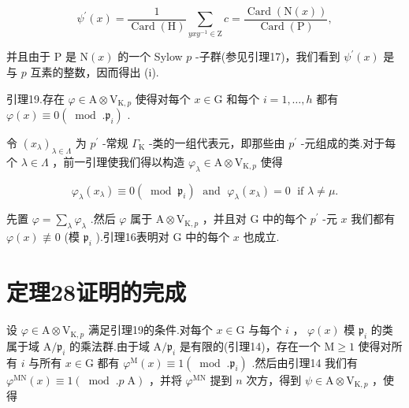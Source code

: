 \documentclass[10pt]{article}
\begin{document}
\[
{\psi }^{\prime }\left( x\right)  = \frac{1}{\operatorname{Card}\left( \mathrm{H}\right) }\mathop{\sum }\limits_{{{yx}{y}^{-1} \in  \mathrm{Z}}}c = \frac{\operatorname{Card}\left( {\mathrm{N}\left( x\right) }\right) }{\operatorname{Card}\left( \mathrm{P}\right) },
\]

并且由于 \(\mathrm{P}\) 是 \(\mathrm{N}\left( x\right)\) 的一个 Sylow \(p\) -子群(参见引理17)，我们看到 \({\psi }^{\prime }\left( x\right)\) 是与 \(p\) 互素的整数，因而得出 (i).

引理19.存在 \(\varphi  \in  \mathrm{A} \otimes  {\mathrm{V}}_{\mathrm{K},p}\) 使得对每个 \(x \in  \mathrm{G}\) 和每个 \(i = 1,\ldots ,h\) 都有 \(\varphi \left( x\right)  \equiv  0\left( {\;\operatorname{mod}\;.{\mathfrak{p}}_{i}}\right)\) .

令 \({\left( {x}_{\lambda }\right) }_{\lambda  \in  \Lambda }\) 为 \({p}^{\prime }\) -常规 \({\Gamma }_{\mathrm{K}}\) -类的一组代表元，即那些由 \({p}^{\prime }\) -元组成的类.对于每个 \(\lambda  \in  \Lambda\) ，前一引理使我们得以构造 \({\varphi }_{\lambda } \in  \mathrm{A} \otimes  {\mathrm{V}}_{\mathrm{K},p}\) 使得

\[
{\varphi }_{\lambda }\left( {x}_{\lambda }\right)  \equiv  0\left( {\;\operatorname{mod}\;{\mathfrak{p}}_{i}}\right) \;\text{ and }\;{\varphi }_{\lambda }\left( {x}_{\lambda }\right)  = 0\;\text{ if }\lambda  \neq  \mu .
\]

先置 \(\varphi  = \mathop{\sum }\limits_{\lambda }{\varphi }_{\lambda }\) .然后 \(\varphi\) 属于 \(\mathrm{A} \otimes  {\mathrm{V}}_{\mathrm{K},p}\) ，并且对 G 中的每个 \({p}^{\prime }\) -元 \(x\) 我们都有 \(\varphi \left( x\right)  \text{ ≢ } 0\) (模 \({\mathfrak{p}}_{i}\) ).引理16表明对 \(\mathrm{G}\) 中的每个 \(x\) 也成立.

\section*{定理28证明的完成}

设 \(\varphi  \in  \mathrm{A} \otimes  {\mathrm{V}}_{\mathrm{K},p}\) 满足引理19的条件.对每个 \(x \in  \mathrm{G}\) 与每个 \(i\) ， \(\varphi \left( x\right)\) 模 \({\mathfrak{p}}_{i}\) 的类属于域 \(\mathrm{A}/{\mathfrak{p}}_{i}\) 的乘法群.由于域 \(\mathrm{A}/{\mathfrak{p}}_{i}\) 是有限的(引理14)，存在一个 \(\mathrm{M} \geq  1\) 使得对所有 \(i\) 与所有 \(x \in  \mathrm{G}\) 都有 \({\varphi }^{\mathrm{M}}\left( x\right)  \equiv  1\left( {\;\operatorname{mod}\;.{\mathfrak{p}}_{i}}\right)\) .然后由引理14 我们有 \({\varphi }^{\mathrm{{MN}}}\left( x\right)  \equiv  1\left( {{\;\operatorname{mod}\;.}p\mathrm{\;A}}\right)\) ，并将 \({\varphi }^{\mathrm{{MN}}}\) 提到 \(n\) 次方，得到 \(\psi  \in  \mathrm{A} \otimes  {\mathrm{V}}_{\mathrm{K},p}\) ，使得
\end{document}
